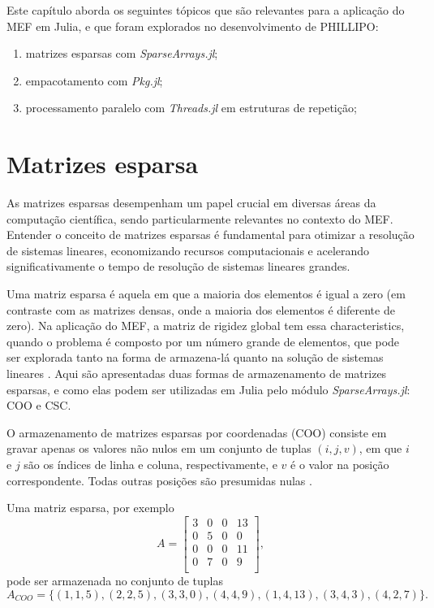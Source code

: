 Este capítulo aborda os seguintes tópicos que são relevantes para a aplicação do MEF em Julia, e que foram explorados no desenvolvimento de PHILLIPO:

\begin{enumerate}
    \item matrizes esparsas com \emph{SparseArrays.jl};
    \item empacotamento com \emph{Pkg.jl};
    \item processamento paralelo com \emph{Threads.jl} em estruturas de repetição;
\end{enumerate}



\section{Matrizes esparsa}

As matrizes esparsas desempenham um papel crucial em diversas áreas da computação científica, sendo particularmente relevantes no contexto do MEF. Entender o conceito de matrizes esparsas é fundamental para otimizar a resolução de sistemas lineares, economizando recursos computacionais e acelerando significativamente o tempo de resolução de sistemas lineares grandes.

Uma matriz esparsa é aquela em que a maioria dos elementos é igual a zero (em contraste com as matrizes densas, onde a maioria dos elementos é diferente de zero). Na aplicação do MEF, a matriz de rigidez global tem essa characteristics, quando o problema é composto por um número grande de elementos, que pode ser explorada tanto na forma de armazena-lá quanto na solução de sistemas lineares \cite{LOGAN}. Aqui são apresentadas duas formas de armazenamento de matrizes esparsas, e como elas podem ser utilizadas em Julia pelo módulo \emph{SparseArrays.jl}: COO e CSC.


O armazenamento de matrizes esparsas por coordenadas (COO) consiste em gravar apenas os valores não nulos em um conjunto de tuplas $(i, j, v)$, em que $i$ e $j$ são os índices de linha e coluna, respectivamente, e $v$ é o valor na posição correspondente. Todas outras posições são presumidas nulas \cite{sparse}. 

Uma matriz esparsa, por exemplo
\begin{equation}
    A = 
    \begin{bmatrix}
        3 & 0 & 0 & 13 \\
        0 & 5 & 0 & 0 \\
        0 & 0 & 0 & 11 \\
        0 & 7 & 0 & 9 \\
    \end{bmatrix},
    \label{eq:coo_matrix}
\end{equation}
pode ser armazenada no conjunto de tuplas
\begin{equation}
    A_{COO} = \{(1,1,5), (2,2,5), (3,3,0), (4,4,9), (1,4,13), (3,4,3), (4,2,7)\}.
    \label{eq:coo}
\end{equation}

